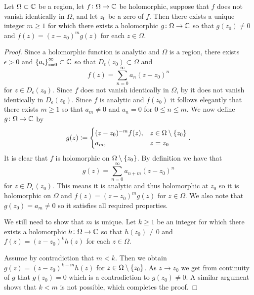 \documentclass[11pt,a4paper]{article}
\begin{document}
\begin{proposition}
  \label{prp:zero-can-be-removed}
  Let $\Omega \subset \mathbb{C}$ be a region,
  let $f \colon \Omega \to \mathbb{C}$ be holomorphic,
  suppose that $f$ does not vanish identically in $\Omega$,
  and let $z_0$ be a zero of $f$.
  Then there exists a unique integer $m \geq 1$ for which there exists a
  holomorphic $g \colon \Omega \to \mathbb{C}$ so that $g(z_0) \neq 0$ and
  $f(z) = (z - z_0)^m g(z)$ for each $z \in \Omega$.
\end{proposition}
\begin{proof}
  Since a holomorphic function is analytic and $\Omega$ is a region,
  there exists $\epsilon > 0$ and $\left\{a_i\right\}_{i=0}^{\infty} \subset \mathbb{C}$
  so that $D_{\epsilon}(z_0) \subset \Omega$ and
  \[
    f(z) = \sum_{n=0}^{\infty} a_n(z - z_0)^n
  \]
  for $z \in D_{\epsilon}(z_0)$.
  Since $f$ does not vanish identically in $\Omega$,
  by  it does not vanish
  identically in $D_{\epsilon}(z_0)$.
  Since $f$ is analytic and $f(z_0)$ it follows elegantly
  that there exists $m \geq 1$ so that $a_m \neq 0$ and $a_n = 0$
  for $0 \le n \le m$.
  We now define $g \colon \Omega \to \mathbb{C}$ by
  \[
    g(z) :=
    \begin{cases}
      (z - z_0)^{-m} f(z), &z \in \Omega \setminus \left\{z_0\right\} \\
      a_m, &z = z_0
    \end{cases}.
  \]
  It is clear that $f$ is holomorphic on $\Omega \setminus \left\{z_0\right\}$.
  By definition we have that
  \[
    g(z) = \sum_{n=0}^{\infty} a_{n+m} (z - z_0)^n
  \]
  for $z \in D_{\epsilon}(z_0)$.
  This means it is analytic and thus holomorphic at $z_0$ so it is holomorphic
  on $\Omega$ and $f(z) = (z - z_0)^{m} g(z)$ for $z \in \Omega$.
  We also note that $g(z_0) = a_m \neq 0$ so it satisfies all required
  properties.

  We still need to show that $m$ is unique.
  Let $k \geq 1$ be an integer for which there exists a
  holomorphic $h \colon \Omega \to \mathbb{C}$ so that $h(z_0) \neq 0$ and
  $f(z) = (z - z_0)^k h(z)$ for each $z \in \Omega$.

  Assume by contradiction that $m < k$.
  Then we obtain $g(z) = (z - z_0)^{k - m} h(z)$
  for $z \in \Omega \setminus \left\{z_0\right\}$.
  As $z \to z_0$ we get from continuity of $g$ that $g(z_0) = 0$ which is
  a contradiction to $g(z_0) \neq 0$.
  A similar argument shows that $k < m$ is not possible,
  which completes the proof.
\end{proof}
\end{document}
